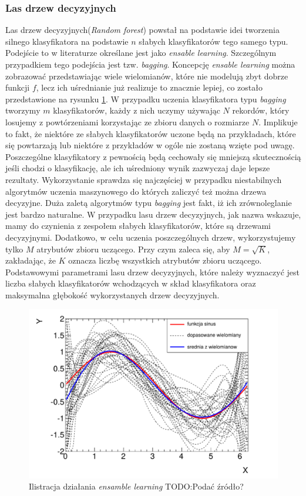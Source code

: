 \subsubsection{Las drzew decyzyjnych}
Las drzew decyzyjnych(\textit{Random forest}) powstał na podstawie idei tworzenia silnego klasyfikatora na podstawie $n$ słabych klasyfikatorów tego samego typu. Podejście to w literaturze określane jest jako \textit{ensable learning}. Szczególnym przypadkiem tego podejścia jest tzw. \textit{bagging}\cite{gonczarek}. Koncepcję \textit{ensable learning} można zobrazować przedstawiając wiele wielomianów, które nie modelują zbyt dobrze funkcji $f$, lecz ich uśrednianie już realizuje to znacznie lepiej, co zostało przedstawione na rysunku \ref{avg1}.  W przypadku uczenia klasyfikatora typu \textit{bagging} tworzymy $m$ klasyfikatorów, każdy z nich uczymy używając $N$ rekordów, który losujemy z powtórzeniami korzystając ze zbioru danych o rozmiarze $N$. Implikuje to fakt, że niektóre ze słabych klasyfikatorów uczone będą na przykładach, które się powtarzają lub niektóre z przykładów w ogóle nie zostaną wzięte pod uwagę. Poszczególne klasyfikatory z pewnością będą cechowały się mniejszą skutecznością jeśli chodzi o klasyfikację, ale ich uśredniony wynik zazwyczaj daje lepsze rezultaty. Wykorzystanie sprawdza się najczęściej w przypadku niestabilnych algorytmów uczenia maszynowego do których zaliczyć też można drzewa decyzyjne\cite{ensable}. Duża zaletą algorytmów typu \textit{bagging} jest fakt, iż ich zrównoleglanie jest bardzo naturalne.
W przypadku lasu drzew decyzyjnych, jak nazwa wskazuje, mamy do czynienia z zespołem słabych klasyfikatorów, które są drzewami decyzyjnymi. Dodatkowo, w celu uczenia poszczególnych drzew, wykorzystujemy tylko $M$ atrybutów zbioru uczącego. Przy czym zaleca się, aby $M=\sqrt{K}$, zakładając, że $K$ oznacza liczbę wszystkich atrybutów zbioru uczącego. Podstawowymi parametrami lasu drzew decyzyjnych, które należy wyznaczyć jest liczba słabych klasyfikatorów wchodzących w skład klasyfikatora oraz maksymalna głębokość wykorzystanych drzew decyzyjnych.
\begin{figure}[ht!]
\centering
\includegraphics[scale=0.7]{res/avg1.png}
\caption[Caption for LOF]{Ilistracja działania \textit{ensamble learning} TODO:Podać źródło?\label{avg1}}
\end{figure} 

